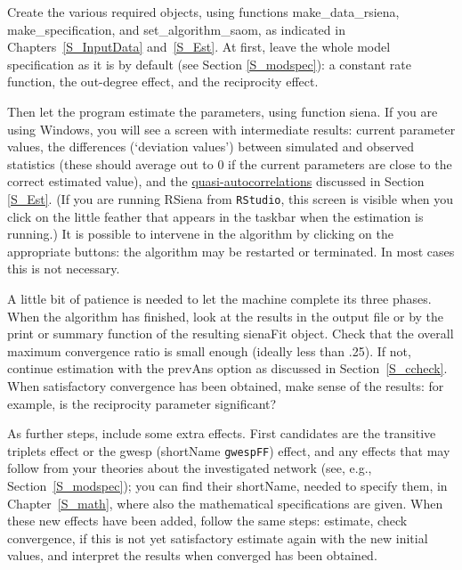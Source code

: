 \documentclass[a4paper,fleqn,11pt]{article}
\newcommand{\+}{\, + \,}
\newcommand{\sfn}[1]{\textsf{#1}}
\newcommand{\RS}{{\sf \textsf{RSiena} }}
\begin{document}
Create the various required objects, using functions
\textsf{make\_data\_rsiena}, \textsf{make\_specification}, and \textsf{set\_algorithm\_saom},
as indicated in Chapters~\ref{S_InputData} and~\ref{S_Est}.
At first, leave the whole model specification as
it is by default (see Section \ref{S_modspec}):
a constant rate function, the out-degree effect, and
the reciprocity effect.

Then let the program estimate the parameters, using function \textsf{siena}.
If you are using Windows, you will see a
screen with intermediate results: current parameter values, the
differences (`deviation values') between simulated and observed
statistics (these should average out to 0 if the current
parameters are close to the correct estimated value), and the
\hyperlink{T_quasiac}{quasi-autocorrelations} discussed in Section
\ref{S_Est}.
(If you are running \RS from \texttt{RStudio}, this screen is visible
when you click on the little feather that appears in the taskbar
when the estimation is running.)
It is possible to intervene in the algorithm by clicking on the
appropriate buttons:
the algorithm may be restarted or terminated. In most cases
this is not necessary.

A little bit of patience is needed to let the machine complete its three
phases.
When the algorithm has finished, look at the results in the output file
or by the \sfn{print} or \sfn{summary} function of the
resulting \sfn{sienaFit} object. Check
that the overall maximum convergence ratio is small enough
(ideally less than .25).
If not, continue estimation with the \sfn{prevAns} option
as discussed in Section~\ref{S_ccheck}.
When satisfactory convergence has been obtained, make sense
of the results: for example, is the reciprocity parameter significant?

As further steps, include some extra effects. First candidates
are the transitive triplets effect or the
gwesp (shortName \texttt{gwespFF}) effect, and any
effects that may follow from your theories about the investigated network
(see, e.g., Section~\ref{S_modspec});
you can find their \sfn{shortName},
needed to specify them, in Chapter~\ref{S_math},
where also the mathematical specifications are given.
When these new effects have been added, follow the same steps:
estimate, check convergence, if this is not yet satisfactory
estimate again with the new initial values, and interpret the
results when converged has been obtained.
\end{document}
